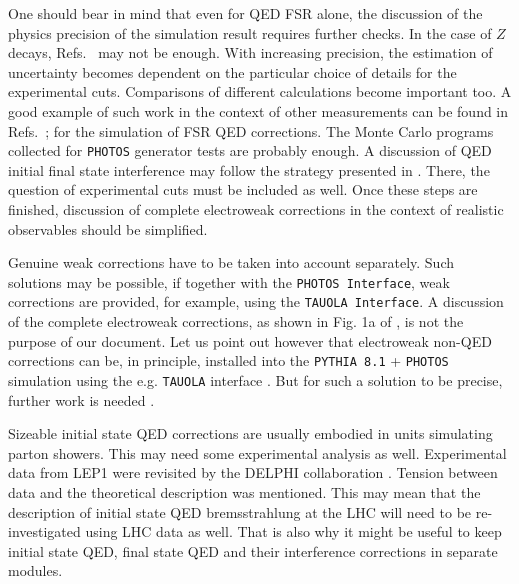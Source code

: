 \documentclass[]{Photos_interface_design}
\begin{document}
One should bear in mind that even for QED FSR alone, the discussion of the physics 
precision of the simulation result requires further checks. In the case of 
$Z$ decays, Refs.~\cite{Golonka:2006tw,Golonka:2005pn} may not be enough.
With increasing precision, the estimation of uncertainty becomes dependent on 
the particular choice of details for the experimental cuts. Comparisons of different
calculations become important too. A good example of such work in the context of 
other measurements can be found in Refs.~\cite{Jadach:1995pd,Arbuzov:1996eq}; 
for the simulation of 
FSR QED corrections. The Monte Carlo programs collected for {\tt PHOTOS} generator 
tests are probably enough. 
A discussion of QED initial final state interference may follow the strategy presented
in \cite{Jadach:1999gz}. There, the question of experimental cuts must be included 
as well. Once these steps are finished, discussion 
of complete electroweak corrections in the context of realistic observables should 
be simplified.



Genuine weak corrections have to be taken into account separately.
Such solutions may be possible,  if together with the {\tt PHOTOS Interface},
 weak corrections are provided, for example, using the {\tt TAUOLA Interface}.
A discussion
of the complete electroweak corrections, as shown in Fig. 1a of  \cite{Adam:2008ge},
is not the purpose of our document. Let us point out however that electroweak 
non-QED corrections can be, in principle, installed into the {\tt PYTHIA 8.1} + {\tt PHOTOS} simulation 
using the e.g. {\tt TAUOLA} interface \cite{Davidson:2010rw}.
But for such a solution to be precise, further work is needed \cite{Bardin-private}.

Sizeable initial state QED corrections are usually embodied in  units 
simulating parton showers. This may need some experimental analysis as well. 
Experimental data from LEP1 were revisited by the DELPHI collaboration \cite{Abdallah:2010tk}.
Tension between data and the theoretical description was
mentioned. This may mean that the description of initial state QED bremsstrahlung 
at the LHC will need to be re-investigated using LHC data as well.
That is also why it  might be useful to keep initial state QED, final state QED and their interference corrections in separate modules. 

\end{document}
